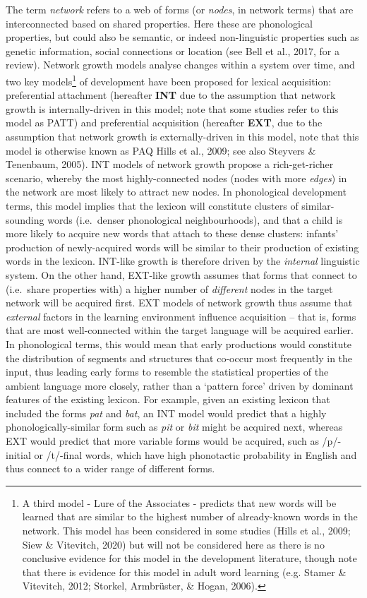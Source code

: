 \documentclass[
  man]{apa6}
\begin{document}
The term \emph{network} refers to a web of forms (or \emph{nodes}, in network terms) that are interconnected based on shared properties. Here these are phonological properties, but could also be semantic, or indeed non-linguistic properties such as genetic information, social connections or location (see Bell et al., 2017, for a review). Network growth models analyse changes within a system over time, and two key models\footnote{A third model - Lure of the Associates - predicts that new words will be learned that are similar to the highest number of already-known words in the network. This model has been considered in some studies (Hills et al., 2009; Siew \& Vitevitch, 2020) but will not be considered here as there is no conclusive evidence for this model in the development literature, though note that there is evidence for this model in adult word learning (e.g. Stamer \& Vitevitch, 2012; Storkel, Armbrüster, \& Hogan, 2006).} of development have been proposed for lexical acquisition: preferential attachment (hereafter \textbf{INT} due to the assumption that network growth is internally-driven in this model; note that some studies refer to this model as PATT) and preferential acquisition (hereafter \textbf{EXT}, due to the assumption that network growth is externally-driven in this model, note that this model is otherwise known as PAQ Hills et al., 2009; see also Steyvers \& Tenenbaum, 2005). INT models of network growth propose a rich-get-richer scenario, whereby the most highly-connected nodes (nodes with more \emph{edges}) in the network are most likely to attract new nodes. In phonological development terms, this model implies that the lexicon will constitute clusters of similar-sounding words (i.e.~denser phonological neighbourhoods), and that a child is more likely to acquire new words that attach to these dense clusters: infants' production of newly-acquired words will be similar to their production of existing words in the lexicon. INT-like growth is therefore driven by the \emph{internal} linguistic system. On the other hand, EXT-like growth assumes that forms that connect to (i.e.~share properties with) a higher number of \emph{different} nodes in the target network will be acquired first. EXT models of network growth thus assume that \emph{external} factors in the learning environment influence acquisition -- that is, forms that are most well-connected within the target language will be acquired earlier. In phonological terms, this would mean that early productions would constitute the distribution of segments and structures that co-occur most frequently in the input, thus leading early forms to resemble the statistical properties of the ambient language more closely, rather than a `pattern force' driven by dominant features of the existing lexicon. For example, given an existing lexicon that included the forms \emph{pat} and \emph{bat}, an INT model would predict that a highly phonologically-similar form such as \emph{pit} or \emph{bit} might be acquired next, whereas EXT would predict that more variable forms would be acquired, such as /p/-initial or /t/-final words, which have high phonotactic probability in English and thus connect to a wider range of different forms.
\end{document}
